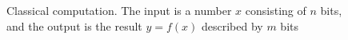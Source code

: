 \begin{figure}
\centering



\caption{Classical computation. The input is a number $x$ consisting
  of $n$ bits, and the output is the result $y = f\left(x\right)$ described by $m$ bits}
\label{figQuantCompClassComp}
\end{figure}